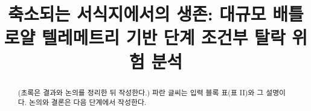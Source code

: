 \documentclass[conference]{IEEEtran}
\newcommand{\rev}[1]{{\color{revblue}#1}}
\begin{document}
\title{축소되는 서식지에서의 생존: 대규모 배틀로얄 텔레메트리 기반 단계 조건부 탈락 위험 분석}
\author{}
\maketitle

\begin{abstract}
(초록은 결과와 논의를 정리한 뒤 작성한다.) \rev{파란 글씨는 입력 블록 표(표 II)와 그 설명이다. 논의와 결론은 다음 단계에서 작성한다.}
\end{abstract}








\end{document}
